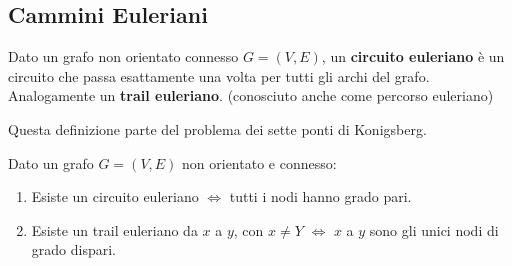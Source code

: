 \subsection{Cammini Euleriani}
\begin{definition}
    Dato un grafo non orientato connesso $G = (V,E)$, un \textbf{circuito euleriano} è un circuito che passa esattamente una volta per tutti gli archi del grafo. Analogamente un \textbf{trail euleriano}. (conosciuto anche come percorso euleriano)
\end{definition}
Questa definizione parte del problema dei sette ponti di Konigsberg.
\begin{theorem}
Dato un grafo $G = (V,E)$ non orientato e connesso:
\begin{enumerate}
    \item Esiste un circuito euleriano $\Longleftrightarrow$ tutti i nodi hanno grado pari.
    \item Esiste un trail euleriano da $x$ a $y$, con $x \neq Y$ $\Longleftrightarrow$ $x$ a $y$ sono gli unici nodi di grado dispari.
\end{enumerate}
\end{theorem}

